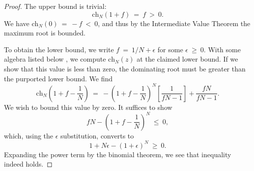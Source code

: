 \documentclass{article}
\numberwithin{equation}{section}
\newcommand{\ch}{\text{ch}}
\begin{document}
\begin{proof}
    The upper bound is trivial:
    \begin{equation}
        \ch_N(1+f) \ = \ f \ >\  0.
    \end{equation}
    We have $\ch_N(0) \ = \  -f \ < \  0$, and thus by the Intermediate Value Theorem the maximum root is 
    bounded. 

    To obtain the lower bound, we write $f \ =  \ 1/N + \epsilon$ for 
    some $\epsilon \ \geq \  0$. With some algebra listed below
    , we compute $\ch_N(z)$ at the claimed lower 
    bound. If we show that this value is less than zero, the dominating root must be greater than the purported lower bound. We find
    \begin{equation}
        \ch_N\left(
            1 + f - \frac 1 N
        \right)  \ = \ -
        \left(
            1 + f - \frac 1 N
        \right)^N \left[
            \frac {1} {fN - 1}
        \right]
        + \frac {fN} {fN - 1}.
    \end{equation}
    We wish to bound this value by zero. It suffices to show 
    \begin{equation}
        fN - \left(
            1 + f - \frac 1 N
        \right)^N \ \leq\ 0,
    \end{equation}
    which, using the $\epsilon$ substitution, converts to
    \begin{equation}
        1 + N\epsilon - (1 + \epsilon)^N \ \geq \ 0.
    \end{equation}
    Expanding the power term by the binomial theorem, we see that inequality indeed holds. 
\end{proof}
\end{document}
